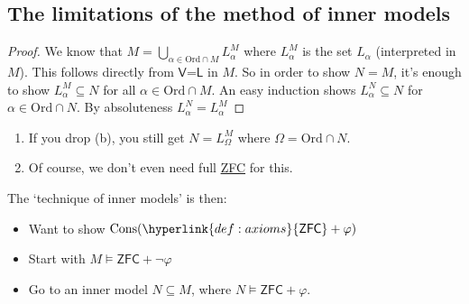 \documentclass{article}
\newcommand{\named}[1]{\textbf{#1}\index{#1}}
\newcommand{\1}{\mathbbm{1}}
\DeclareMathOperator{\cons}{Cons}
\let\models\vDash
\begin{document}
\subsection{The limitations of the method of inner models}
\begin{proof}
  We know that $M = \bigcup_{\alpha \in \text{Ord} \cap M} L_\alpha^{M}$ where $L_\alpha^M$ is the set $L_\alpha$ (interpreted in $M$).
  This follows directly from $\textsf{V=L}$ in $M$.
  So in order to show $N=M$, it's enough to show $L_\alpha^M \subseteq N$ for all $\alpha \in \text{Ord} \cap M$.
  An easy induction shows $L_\alpha^N \subseteq N$ for $\alpha \in \text{Ord} \cap N$. By absoluteness $L_\alpha^N = L_\alpha^M$
\end{proof}
\begin{remark}\leavevmode
  \begin{enumerate}
    \item If you drop (b), you still get $N = L_\Omega^M$ where $\Omega = \text{Ord} \cap N$.
    \item Of course, we don't even need full \hyperlink{def:axioms}{\textsf{ZFC}} for this.
  \end{enumerate}
\end{remark}
The `technique of inner models' is then:
\begin{itemize}
  \item Want to show $\cons(\hyperlink{def:axioms}{\textsf{ZFC}}+\varphi)$
  \item Start with $M \models \textsf{ZFC} + \neg \varphi$
  \item Go to an inner model $N \subseteq M$, where $N \models \textsf{ZFC} +\varphi$.
\end{itemize}
\end{document}
